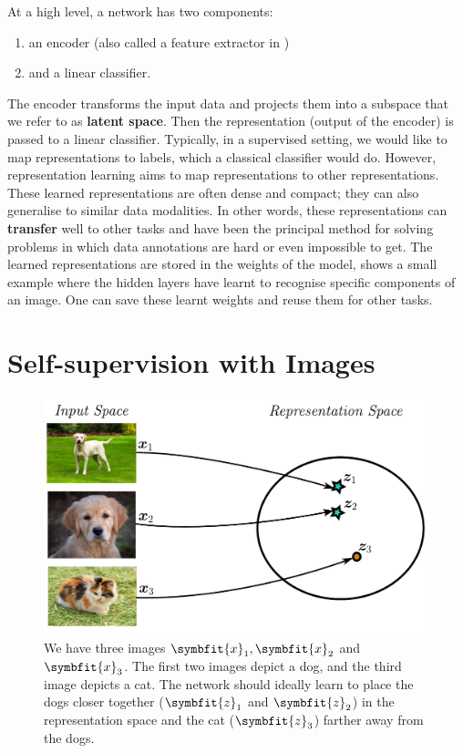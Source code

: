 At a high level, a network has two components:
\begin{enumerate}
    \item an encoder (also called a feature extractor in )
    \item and a linear classifier.
\end{enumerate}
The encoder transforms the input data and projects them into a subspace that we refer to as \textbf{latent space}. Then the representation (output of the encoder) is passed to a linear classifier. Typically, in a supervised setting, we would like to map representations to labels, which a classical classifier would do. 
However, representation learning aims to map representations to other representations. These learned representations are often dense and compact; they can also generalise to similar data modalities. In other words, these representations can \textbf{transfer} well to other tasks and have been the principal method for solving problems in which data annotations are hard or even impossible to get. The learned representations are stored in the weights of the model,  shows a small example where the hidden layers have learnt to recognise specific components of an image. One can save these learnt weights and reuse them for other tasks. 

\section{Self-supervision with Images} \label{sec:self-sup-with-images}

\begin{figure}
    \centering
    \includegraphics[scale=0.4]{chapters/assets/ssl_figs/representation_space.pdf}
    \caption{We have three images $\symbfit{x}_1, \symbfit{x}_2$ and $\symbfit{x}_3$. The first two images depict a dog, and the third image depicts a cat. The network should ideally learn to place the dogs closer together ($\symbfit{z}_1$ and $\symbfit{z}_2$) in the representation space and the cat ($\symbfit{z}_3$) farther away from the dogs.}
    \label{fig:my_label}
\end{figure}

